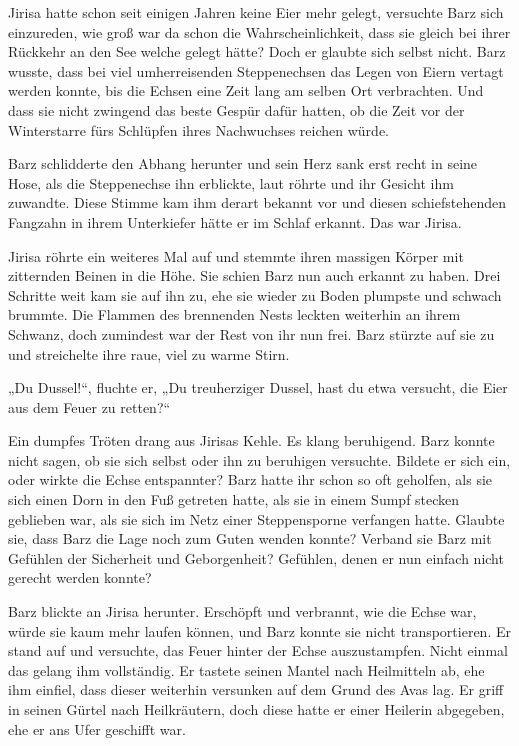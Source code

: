 Jirisa hatte schon seit einigen Jahren keine Eier mehr gelegt, versuchte Barz sich einzureden, wie groß war da schon die Wahrscheinlichkeit, dass sie gleich bei ihrer Rückkehr an den See welche gelegt hätte? Doch er glaubte sich selbst nicht. Barz wusste, dass bei viel umherreisenden Steppenechsen das Legen von Eiern vertagt werden konnte, bis die Echsen eine Zeit lang am selben Ort verbrachten. Und dass sie nicht zwingend das beste Gespür dafür hatten, ob die Zeit vor der Winterstarre fürs Schlüpfen ihres Nachwuchses reichen würde.

Barz schlidderte den Abhang herunter und sein Herz sank erst recht in seine Hose, als die Steppenechse ihn erblickte, laut röhrte und ihr Gesicht ihm zuwandte. Diese Stimme kam ihm derart bekannt vor und diesen schiefstehenden Fangzahn in ihrem Unterkiefer hätte er im Schlaf erkannt. Das war Jirisa.

Jirisa röhrte ein weiteres Mal auf und stemmte ihren massigen Körper mit zitternden Beinen in die Höhe. Sie schien Barz nun auch erkannt zu haben. Drei Schritte weit kam sie auf ihn zu, ehe sie wieder zu Boden plumpste und schwach brummte. Die Flammen des brennenden Nests leckten weiterhin an ihrem Schwanz, doch zumindest war der Rest von ihr nun frei. Barz stürzte auf sie zu und streichelte ihre raue, viel zu warme Stirn.

„Du Dussel!“, fluchte er, „Du treuherziger Dussel, hast du etwa versucht, die Eier aus dem Feuer zu retten?“

Ein dumpfes Tröten drang aus Jirisas Kehle. Es klang beruhigend. Barz konnte nicht sagen, ob sie sich selbst oder ihn zu beruhigen versuchte. Bildete er sich ein, oder wirkte die Echse entspannter? Barz hatte ihr schon so oft geholfen, als sie sich einen Dorn in den Fuß getreten hatte, als sie in einem Sumpf stecken geblieben war, als sie sich im Netz einer Steppensporne verfangen hatte. Glaubte sie, dass Barz die Lage noch zum Guten wenden konnte? Verband sie Barz mit Gefühlen der Sicherheit und Geborgenheit? Gefühlen, denen er nun einfach nicht gerecht werden konnte?

Barz blickte an Jirisa herunter. Erschöpft und verbrannt, wie die Echse war, würde sie kaum mehr laufen können, und Barz konnte sie nicht transportieren. Er stand auf und versuchte, das Feuer hinter der Echse auszustampfen. Nicht einmal das gelang ihm vollständig. Er tastete seinen Mantel nach Heilmitteln ab, ehe ihm einfiel, dass dieser weiterhin versunken auf dem Grund des Avas lag. Er griff in seinen Gürtel nach Heilkräutern, doch diese hatte er einer Heilerin abgegeben, ehe er ans Ufer geschifft war.

